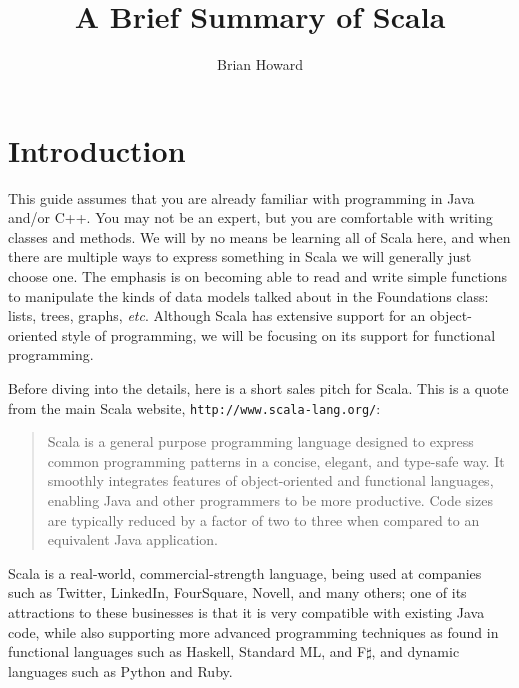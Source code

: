 \documentclass[11pt]{article}
\title{A Brief Summary of Scala}
\author{Brian Howard}
\begin{document}
\maketitle
\section{Introduction}
This guide assumes that you are already familiar with programming in Java and/or C++. You may not be an expert, but you are comfortable with writing classes and methods. We will by no means be learning all of Scala here, and when there are multiple ways to express something in Scala we will generally just choose one. The emphasis is on becoming able to read and write simple functions to manipulate the kinds of data models talked about in the Foundations class: lists, trees, graphs, \textit{etc}. Although Scala has extensive support for an object-oriented style of programming, we will be focusing on its support for functional programming.

Before diving into the details, here is a short sales pitch for Scala. This is a quote from the main Scala website, \texttt{http://www.scala-lang.org/}:
\begin{quotation}
Scala is a general purpose programming language designed to express common programming patterns in a concise, elegant, and type-safe way. It smoothly integrates features of object-oriented and functional languages, enabling Java and other programmers to be more productive. Code sizes are typically reduced by a factor of two to three when compared to an equivalent Java application.
\end{quotation}
Scala is a real-world, commercial-strength language, being used at companies such as Twitter, LinkedIn, FourSquare, Novell, and many others; one of its attractions to these businesses is that it is very compatible with existing Java code, while also supporting more advanced programming techniques as found in functional languages such as Haskell, Standard ML, and F$\sharp$, and dynamic languages such as Python and Ruby.
\end{document}
